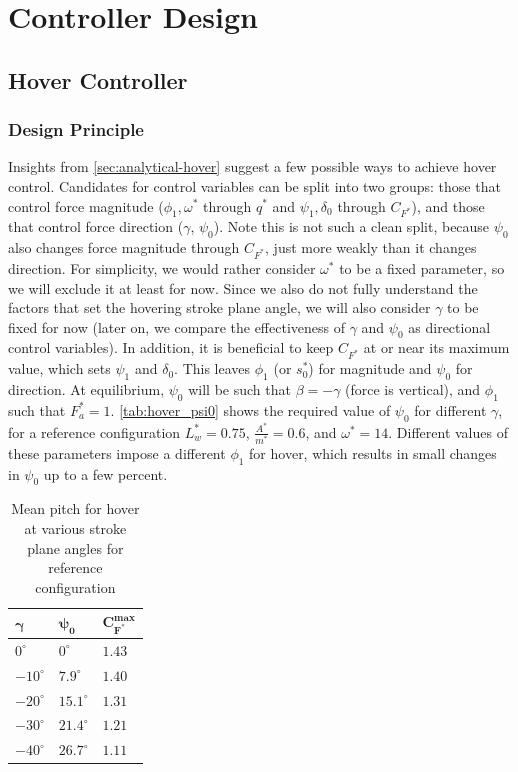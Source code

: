 \documentclass[11pt,letterpaper]{article}
\begin{document}
\section{Controller Design}\label{sec:controller}

\subsection{Hover Controller}

\subsubsection{Design Principle}

Insights from \autoref{sec:analytical-hover} suggest a few possible ways to achieve
hover control. Candidates for control variables can be split into
two groups: those that control force magnitude ($\phi_1, \omega^*$ through
$q^*$ and $\psi_1, \delta_0$ through $C_{F^*}$), and those that control force
direction ($\gamma$, $\psi_0$). Note this is not such a clean
split, because $\psi_0$ also changes force magnitude through $C_{F^*}$,
just more weakly than it changes direction. For simplicity, we
would rather consider $\omega^*$ to be a fixed parameter, so we will exclude it
at least for now.
Since we also do not fully understand the factors
that set the hovering stroke plane angle, we will also
consider $\gamma$ to be fixed for now (later on, we
compare the effectiveness of $\gamma$ and $\psi_0$
as directional control variables).
In addition, it is beneficial to keep $C_{F^*}$ at or near its maximum
value, which sets $\psi_1$ and $\delta_0$. This leaves $\phi_1$ (or $s_0^*$)
for magnitude and $\psi_0$ for direction. At equilibrium,
$\psi_0$ will be such that $\beta = -\gamma$ (force is vertical),
and $\phi_1$ such that $F_a^* = 1$. \autoref{tab:hover_psi0} shows
the required value of $\psi_0$ for different $\gamma$,
for a reference configuration $L_w^* = 0.75$, $\frac{A^*}{m^*} = 0.6$,
and $\omega^* = 14$. Different values of these parameters impose
a different $\phi_1$ for hover, which results in small
changes in $\psi_0$ up to a few percent.
\begin{table}[htbp]
    \centering
    \caption{Mean pitch for hover at various stroke plane angles for reference configuration}\label{tab:hover_psi0}
    \begin{tabular}{lll}\toprule
        $\boldsymbol{\gamma}$ & $\boldsymbol{\psi_0}$ & $\boldsymbol{C_{F^*}^\text{max}}$ \\\midrule
        $0^\circ$ & $0^\circ$ & $1.43$ \\
        $-10^\circ$ & $7.9^\circ$ & $1.40$ \\
        $-20^\circ$ & $15.1^\circ$ & $1.31$ \\
        $-30^\circ$ & $21.4^\circ$ & $1.21$ \\
        $-40^\circ$ & $26.7^\circ$ & $1.11$ \\\bottomrule
    \end{tabular}
\end{table}
\end{document}
